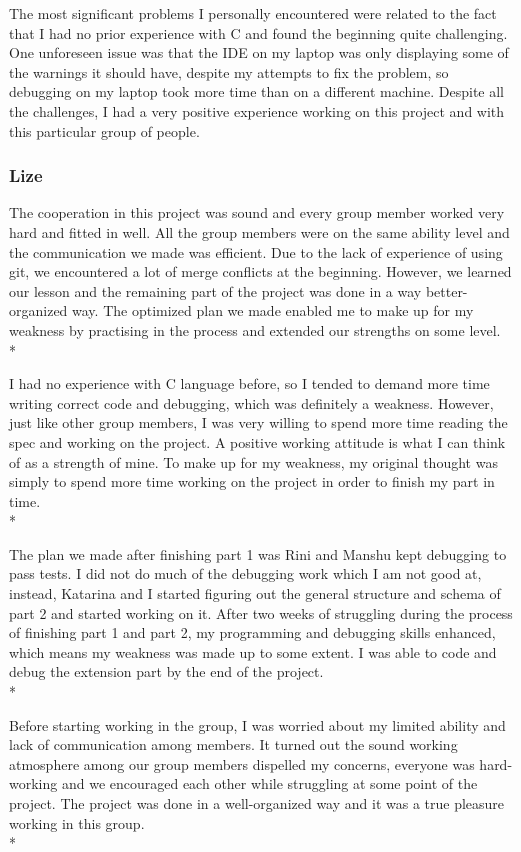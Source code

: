 \documentclass[letterpaper,11pt]{article}
\begin{document}
    \noindent The most significant problems I personally encountered were related to the fact that I had no prior experience with C and found the beginning quite challenging. One unforeseen issue was that the IDE on my laptop was only displaying some of the warnings it should have, despite my attempts to fix the problem, so debugging on my laptop took more time than on a different machine. Despite all the challenges, I had a very positive experience working on this project and with this particular group of people.

    \subsubsection{Lize}
    The cooperation in this project was sound and every group member worked very hard and fitted in well. All the group members were on the same ability level and the communication we made was efficient. Due to the lack of experience of using git, we encountered a lot of merge conflicts at the beginning. However, we learned our lesson and the remaining part of the project was done in a way better-organized way. The optimized plan we made enabled me to make up for my weakness by practising in the process and extended our strengths on some level.\\*

    \noindent I had no experience with C language before, so I tended to demand more time writing correct code and debugging, which was definitely a weakness. However, just like other group members, I was very willing to spend more time reading the spec and working on the project. A positive working attitude is what I can think of as a strength of mine. To make up for my weakness, my original thought was simply to spend more time working on the project in order to finish my part in time.\\*

    \noindent The plan we made after finishing part 1 was Rini and Manshu kept debugging to pass tests. I did not do much of the debugging work which I am not good at, instead, Katarina and I started figuring out the general structure and schema of part 2 and started working on it. After two weeks of struggling during the process of finishing part 1 and part 2, my programming and debugging skills enhanced, which means my weakness was made up to some extent. I was able to code and debug the extension part by the end of the project.\\*

    \noindent Before starting working in the group, I was worried about my limited ability and lack of communication among members. It turned out the sound working atmosphere among our group members dispelled my concerns, everyone was hard-working and we encouraged each other while struggling at some point of the project. The project was done in a well-organized way and it was a true pleasure working in this group.\\*
\end{document}

